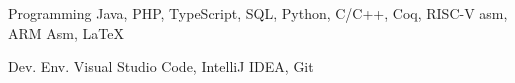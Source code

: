 

\begin{cvskills}

	\cvskill
	{Programming} %
	{Java, PHP, TypeScript, SQL, Python, C/C++, Coq, RISC-V asm, ARM Asm, \LaTeX} %

	\cvskill
	{Dev. Env.} %
	{Visual Studio Code, IntelliJ IDEA, Git} %

\end{cvskills}

